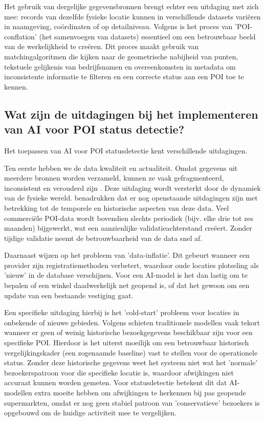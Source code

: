 Het gebruik van dergelijke gegevensbronnen brengt echter een uitdaging met zich mee: records van dezelfde fysieke locatie kunnen in verschillende datasets variëren in naamgeving, coördinaten of op detailniveau. Volgens \textcite{Sun2023} is het proces van 'POI-conflation' (het samenvoegen van datasets) essentieel om een betrouwbaar beeld van de werkelijkheid te creëren. Dit proces maakt gebruik van matchingalgoritmen die kijken naar de geometrische nabijheid van punten, tekstuele gelijkenis van bedrijfsnamen en overeenkomsten in metadata om inconsistente informatie te filteren en een correcte status aan een POI toe te kennen.

\subsection{Wat zijn de uitdagingen bij het implementeren van AI voor POI status detectie?}
\label{sec:uitdagingen}

Het toepassen van AI voor POI statusdetectie kent verschillende uitdagingen.  

Ten eerste hebben we de data kwaliteit en actualiteit. Omdat gegevens uit meerdere bronnen worden verzameld, kunnen ze vaak gefragmenteerd, inconsistent en verouderd zijn \autocite{Rafaqat2023}. Deze uitdaging wordt versterkt door de dynamiek van de fysieke wereld. \textcite{Fernandes2020} benadrukken dat er nog openstaande uitdagingen zijn met betrekking tot de temporele en historische aspecten van deze data. Veel commerciële POI-data wordt bovendien slechts periodiek (bijv. elke drie tot zes maanden) bijgewerkt, wat een aanzienlijke validatieachterstand creëert. Zonder tijdige validatie neemt de betrouwbaarheid van de data snel af. 

Daarnaast wijzen \textcite{Boskovic2026} op het probleem van 'data-inflatie'. Dit gebeurt wanneer een provider zijn registratiemethoden verbetert, waardoor oude locaties plotseling als 'nieuw' in de database verschijnen. Voor een AI-model is het dan lastig om te bepalen of een winkel daadwerkelijk net geopend is, of dat het gewoon om een update van een bestaande vestiging gaat.

Een specifieke uitdaging hierbij is het 'cold-start' probleem voor locaties in onbekende of nieuwe gebieden. Volgens \textcite{Qin2023} schieten traditionele modellen vaak tekort wanneer er geen of weinig historische bezoekgegevens beschikbaar zijn voor een specifieke POI. Hierdoor is het uiterst moeilijk om een betrouwbaar historisch vergelijkingskader (een zogenaamde baseline) vast te stellen voor de operationele status. Zonder deze historische gegevens weet het systeem niet wat het 'normale' bezoekerspatroon voor die specifieke locatie is, waardoor afwijkingen niet accuraat kunnen worden gemeten. Voor statusdetectie betekent dit dat AI-modellen extra moeite hebben om afwijkingen te herkennen bij pas geopende supermarkten, omdat er nog geen stabiel patroon van 'conservatieve' bezoekers is opgebouwd om de huidige activiteit mee te vergelijken.

